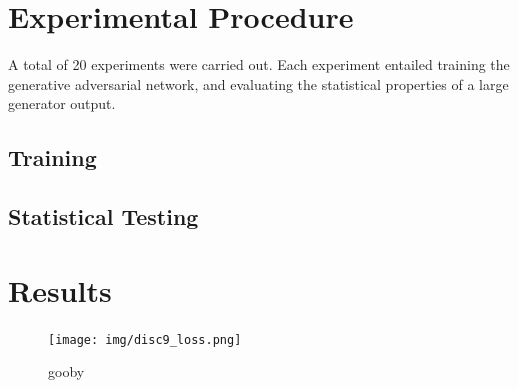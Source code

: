 \documentclass[12pt, titlepage]{report}
\theoremstyle{definition}
\begin{document}
\section{Experimental Procedure}
A total of 20 experiments were carried out. Each experiment entailed training the generative adversarial network, and evaluating the statistical properties of a large generator output.


\subsection{Training}

\subsection{Statistical Testing}


\section{Results}

\begin{figure}
\centering
\texttt{[image: img/disc9\_loss.png]}\\
\caption{gooby}
\label{figure:discriminator_loss}
\end{figure}
\end{document}

